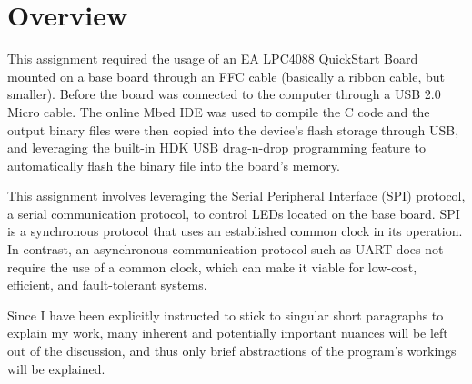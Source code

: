 \documentclass{article}
\begin{document}


\section*{Overview}
\justify
\large
This assignment required the usage of an EA LPC4088 QuickStart Board mounted on a base board through an FFC cable (basically a ribbon cable, but smaller). Before the board was connected to the computer through a USB 2.0 Micro cable. The online Mbed IDE was used to compile the C code and the output binary files were then copied into the device's flash storage through USB, and leveraging the built-in HDK USB drag-n-drop programming feature to automatically flash the binary file into the board's memory.

This assignment involves leveraging the Serial Peripheral Interface (SPI) protocol, a serial communication protocol, to control LEDs located on the base board. SPI is a synchronous protocol that uses an established common clock in its operation. In contrast, an asynchronous communication protocol such as UART does not require the use of a common clock, which can make it viable for low-cost, efficient, and fault-tolerant systems.

Since I have been explicitly instructed to stick to singular short paragraphs to explain my work, many inherent and potentially important nuances will be left out of the discussion, and thus only brief abstractions of the program's workings will be explained.\pagebreak
\end{document}
